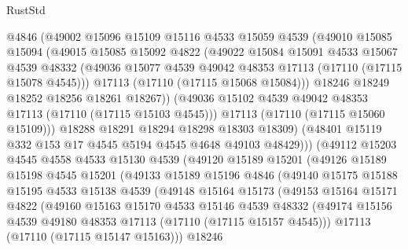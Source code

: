 \begin{lexlean}{RustStd}
\begin{coremodule}
                @4846
                (@49002
                  @15096
                  @15109
                  @15116
                  @4533
                  @15059
                  @4539
                  (@49010
                    @15085
                    @15094
                    (@49015
                      @15085
                      @15092
                      @4822
                      (@49022
                        @15084
                        @15091
                        @4533
                        @15067
                        @4539
                        @48332
                        (@49036 @15077 @4539 @49042 @48353 @17113 (@17110 (@17115 @15078 @4545)))
                        @17113
                        (@17110 (@17115 @15068 @15084)))
                      @18246
                      @18249
                      @18252
                      @18256
                      @18261
                      @18267))
                  (@49036 @15102 @4539 @49042 @48353 @17113 (@17110 (@17115 @15103 @4545)))
                  @17113
                  (@17110 (@17115 @15060 @15109)))
                @18288
                @18291
                @18294
                @18298
                @18303
                @18309)
              (@48401 @15119 @332 @153 @17 @4545 @5194 @4545 @4648 @49103 @48429)))
          (@49112
            @15203
            @4545
            @4558
            @4533
            @15130
            @4539
            (@49120
              @15189
              @15201
              (@49126
                @15189
                @15198
                @4545
                @15201
                (@49133
                  @15189
                  @15196
                  @4846
                  (@49140
                    @15175
                    @15188
                    @15195
                    @4533
                    @15138
                    @4539
                    (@49148
                      @15164
                      @15173
                      (@49153
                        @15164
                        @15171
                        @4822
                        (@49160
                          @15163
                          @15170
                          @4533
                          @15146
                          @4539
                          @48332
                          (@49174 @15156 @4539 @49180 @48353 @17113 (@17110 (@17115 @15157 @4545)))
                          @17113
                          (@17110 (@17115 @15147 @15163)))
                        @18246

\end{coremodule}
\end{lexlean}
